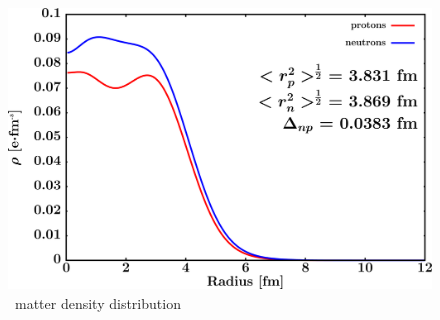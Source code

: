 \begin{figure}[hbtp]
    \centering
    \begin{minipage}{0.70\textwidth}
        \centering
        \includegraphics[width=\linewidth]{figures/ni64_matterDensity.png}
        \caption*{\niFour\ matter density distribution}
        \label{DOMFitData_ni64_matterDensity}
    \end{minipage}
\end{figure}

